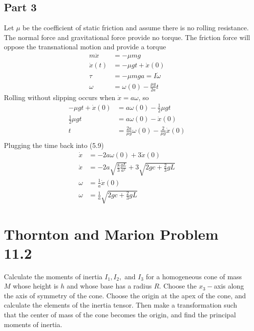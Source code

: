 \subsection{Part 3}
Let $\mu$ be the coefficient of static friction and assume there is no rolling resistance. The normal force and gravitational force provide no torque. The friction force will oppose the transnational motion and provide a torque
\begin{equation}
\begin{split}
    m\ddot{x} &= -\mu mg\\
    \dot{x}(t) &= -\mu g t + \dot{x}(0)\\
    \tau &= -\mu mg a = I\dot{\omega}\\
    \omega &= \omega(0)-\frac{\mu g}{2a}t
\end{split}
\end{equation}
Rolling without slipping occurs when $\dot{x} = a \omega$, so
\begin{equation}
\begin{split}
    -\mu gt+\dot{x}(0) &= a\omega(0) -\frac{1}{2}\mu g t\\
    \frac{1}{2}\mu g t &= a\omega(0)-\dot{x}(0)\\
    t &= \frac{2a}{\mu g}\omega(0)-\frac{2}{\mu g}\dot{x}(0)\\
\end{split}
\end{equation}
Plugging the time back into (5.9)
\begin{equation}
    \begin{split}
        \dot{x} & = - 2a \omega(0) + 3\dot{x}(0)\\
        \dot{x} &=-2a\sqrt{\frac{8}{3}\frac{gL}{a^2}}+3\sqrt{2gc+\frac{2}{3}gL}\\
        \omega &= \frac{1}{a}\dot{x}(0)\\
        \omega &= \frac{1}{a}\sqrt{2gc+\frac{2}{3}gL}
    \end{split}
\end{equation}

\section{Thornton and Marion Problem 11.2}
Calculate the moments of inertia $I_1, I_2,$ and $I_3$ for a homogeneous cone of mass $M$ whose height is $h$ and whose base has a radius $R$. Choose the $x_3-$axis along the axis of symmetry of the cone. Choose the origin at the apex of the cone, and calculate the elements of the inertia tensor. Then make a transformation such that the center of mass of the cone becomes the origin, and find the principal moments of inertia.

